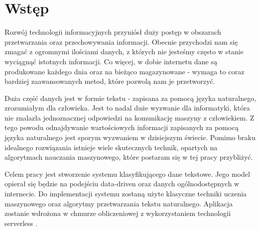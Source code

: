 \chapter{Wstęp}
\label{cha:wstep}

Rozwój technologii informacyjnych przyniósł duży postęp w obszarach przetwarzania oraz przechowywania informacji. Obecnie przychodzi nam się zmagać z ogromnymi ilościami danych, z których nie jesteśmy często w stanie wyciągnąć istotnych informacji. Co więcej, w dobie internetu dane są produkowane każdego dnia oraz na bieżąco magazynowane - wymaga to coraz bardziej zaawansowanych metod, które pozwolą nam je przetworzyć.

Duża część danych jest w formie tekstu - zapisana za pomocą języka naturalnego, zrozumiałym dla człowieka. Jest to nadal duże wyzwanie dla informatyki, która nie znalazła jednoznacznej odpowiedzi na komunikację maszyny z człowiekiem. Z tego powodu odnajdywanie wartościowych informacji zapisanych za pomocą języka naturalnego jest sporym wyzwaniem w dzisiejszym świecie. Pomimo braku idealnego rozwiązania istnieje wiele skutecznych technik, opartych na algorytmach nauczania maszynowego, które postaram się w tej pracy przybliżyć.

Celem pracy jest stworzenie systemu klasyfikującego dane tekstowe. Jego model opierał się będzie na podejściu data-driven \cite{wiki:datadriven} oraz danych ogólnodostępnych w internecie. Do implementacji systemu zostaną użyte klasyczne techniki uczenia maszynowego oraz algorytmy przetwarzania tekstu naturalnego. Aplikacja zostanie wdrożona w chmurze obliczeniowej z wykorzystaniem technologii serverless \cite{Serverless}.